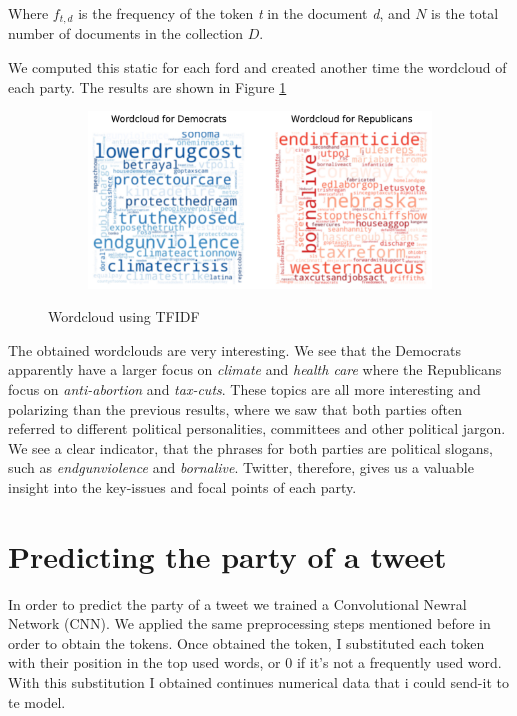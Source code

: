 \documentclass{article}
\begin{document}
Where $f_{t,d}$ is the frequency of the token \textit{t} in the document \textit{d}, and $N$ is the total number of documents in the collection $D$.

We computed this static for each ford and created another time the wordcloud of each party. The results are shown in Figure \ref{fig:WordCloudTFIDF}

\begin{figure}[H]
    \centering
    \begin{subfigure}{.8\textwidth}
        \centering
        \includegraphics[width=1\textwidth]{./img/WordCloudTFIDF.pdf}
    \end{subfigure}
    \caption{Wordcloud using TFIDF}
    \label{fig:WordCloudTFIDF}
\end{figure}


The obtained wordclouds are very interesting. We see that the Democrats apparently have a larger focus on \textit{climate} and \textit{health care} where the Republicans focus on \textit{anti-abortion} and \textit{tax-cuts}. These topics are all more interesting and polarizing than the previous results, where we saw that both parties often referred to different political personalities, committees and other political jargon. We see a clear indicator, that the phrases for both parties are political slogans, such as \textit{endgunviolence} and \textit{bornalive}. Twitter, therefore, gives us a valuable insight into the key-issues and focal points of each party.

\section{Predicting the party of a tweet}
\label{CNN}

In order to predict the party of a tweet we trained a Convolutional Newral Network (CNN). We applied the same preprocessing steps mentioned before in order to obtain the tokens. Once obtained the token, I substituted each token with their position in the top used words, or 0 if it's not a frequently used word. With this substitution I obtained continues numerical data that i could send-it to te model.
\end{document}
